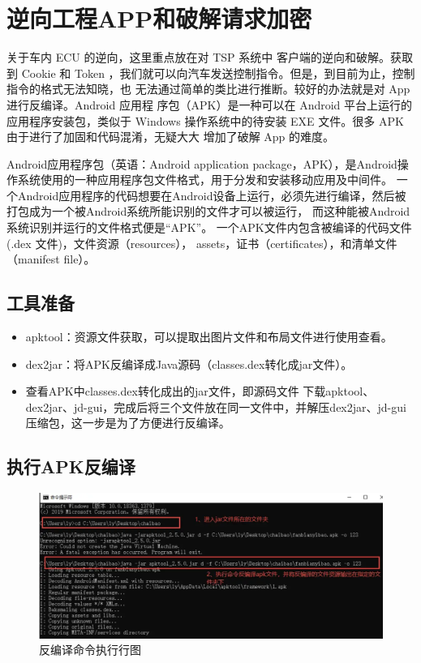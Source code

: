 \section[]{逆向工程APP和破解请求加密
}
关于车内 ECU 的逆向，这里重点放在对 TSP 系统中
客户端的逆向和破解。获取到 Cookie 和 Token ，我们就可以向汽车发送控制指令。但是，到目前为止，控制指令的格式无法知晓，也
无法通过简单的类比进行推断。较好的办法就是对 App 进行反编译。Android 应用程
序包（APK）是一种可以在 Android 平台上运行的应用程序安装包，类似于 Windows
操作系统中的待安装 EXE 文件。很多 APK 由于进行了加固和代码混淆，无疑大大
增加了破解 App 的难度。

Android应用程序包（英语：Android application package，APK），是Android操作系统使用的一种应用程序包文件格式，用于分发和安装移动应用及中间件。
一个Android应用程序的代码想要在Android设备上运行，必须先进行编译，然后被打包成为一个被Android系统所能识别的文件才可以被运行，
而这种能被Android系统识别并运行的文件格式便是“APK”。 
一个APK文件内包含被编译的代码文件(.dex 文件)，文件资源（resources）， assets，证书（certificates），和清单文件（manifest file）。

\subsection*{工具准备}
\begin{itemize}
    \item apktool：资源文件获取，可以提取出图片文件和布局文件进行使用查看。
    \item dex2jar：将APK反编译成Java源码（classes.dex转化成jar文件）。
    \item 查看APK中classes.dex转化成出的jar文件，即源码文件 下载apktool、dex2jar、jd-gui，完成后将三个文件放在同一文件中，并解压dex2jar、jd-gui压缩包，这一步是为了方便进行反编译。
\end{itemize}

\subsection*{执行APK反编译}
\begin{figure}
    \centering
    \includegraphics[scale=0.5]{resources/img/i19.png}
    \caption{反编译命令执行行图}
  \end{figure}

